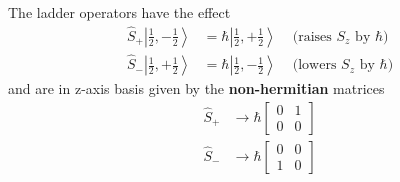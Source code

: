 The ladder operators have the effect
\begin{align*}
    \hat{S}_{+}\left|\frac{1}{2},-\frac{1}{2}\right> & =\hbar\left|\frac{1}{2},+\frac{1}{2}\right> & \text{ (raises $S_z$ by $\hbar$)} \\
    \hat{S}_{-}\left|\frac{1}{2},+\frac{1}{2}\right> & =\hbar\left|\frac{1}{2},-\frac{1}{2}\right> & \text{ (lowers $S_z$ by $\hbar$)}
\end{align*}
and are in z-axis basis given by the \textbf{non-hermitian} matrices
\begin{align*}
    \hat{S}_{+} & \rightarrow \hbar\begin{bmatrix}
                                       0 & 1 \\
                                       0 & 0
                                   \end{bmatrix} \\
    \hat{S}_{-} & \rightarrow \hbar\begin{bmatrix}
                                       0 & 0 \\
                                       1 & 0
                                   \end{bmatrix}
\end{align*}







